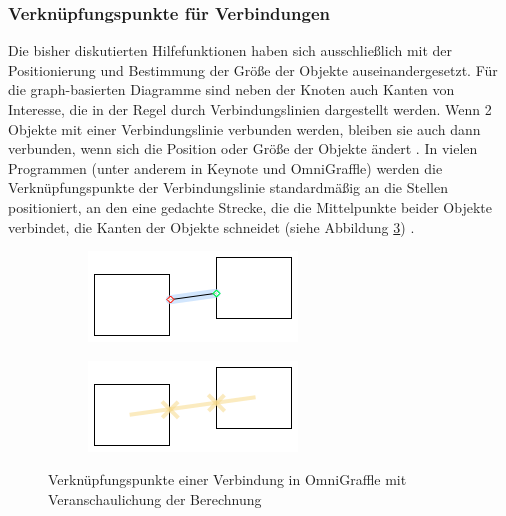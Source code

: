 \subsubsection{Verknüpfungspunkte für Verbindungen}


Die bisher diskutierten Hilfefunktionen haben sich ausschließlich mit der Positionierung und Bestimmung der Größe der Objekte auseinandergesetzt. Für die graph-basierten Diagramme sind neben der Knoten auch Kanten von Interesse, die in der Regel durch Verbindungslinien dargestellt werden. Wenn 2 Objekte mit einer Verbindungslinie verbunden werden, bleiben sie auch dann verbunden, wenn sich die Position oder Größe der Objekte ändert \cite{11Keynote}. In vielen Programmen (unter anderem in Keynote und OmniGraffle) werden die Verknüpfungspunkte der Verbindungslinie standardmäßig an die Stellen positioniert, an den eine gedachte Strecke, die die Mittelpunkte beider Objekte verbindet, die Kanten der Objekte schneidet (siehe Abbildung \ref{fig:omnigraffle-connection-points}) \cite{08OmniGraffle}.

\begin{figure}[hbt]
    \newcommand{\subfigurewidth}{0.5\textwidth}
    \newcommand{\graphicswidth}{0.8\linewidth}
    \begin{subfigure}{\subfigurewidth}
        \centering
        \includegraphics[width=\graphicswidth]{resources/omnigraffle-connection-points-a}
        \caption{}
        \label{fig:omnigraffle-connection-points-a}
    \end{subfigure}
    \begin{subfigure}{\subfigurewidth}
        \centering
        \includegraphics[width=\graphicswidth]{resources/omnigraffle-connection-points-b}
        \caption{}
        \label{fig:omnigraffle-connection-points-b}
    \end{subfigure}
    \caption{Verknüpfungspunkte einer Verbindung in OmniGraffle  mit Veranschaulichung der Berechnung }
    \label{fig:omnigraffle-connection-points}
\end{figure}

